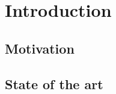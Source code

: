 

\chapter{Introduction}

\graphicspath{{introduction/figures/}}


\section{Motivation}

\section{State of the art}




